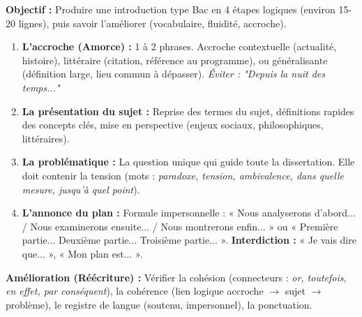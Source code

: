 \documentclass[11pt]{article}
\newcommand{\cle}[1]{{\popxbold\color{popdark}#1}}
\begin{document}
\begin{methode}
    \textbf{Objectif :} Produire une introduction type Bac en 4 étapes logiques (environ 15-20 lignes), puis savoir l'améliorer (vocabulaire, fluidité, accroche).
    \begin{enumerate}
        \item \textbf{L'accroche (Amorce) :} 1 à 2 phrases. \cle{Accroche contextuelle} (actualité, histoire), \cle{littéraire} (citation, référence au programme), ou \cle{généralisante} (définition large, lieu commun à dépasser). \textit{Éviter : "Depuis la nuit des temps..."}
        \item \textbf{La présentation du sujet :} Reprise des termes du sujet, définitions rapides des concepts clés, mise en perspective (enjeux sociaux, philosophiques, littéraires).
        \item \textbf{La problématique :} \cle{La question unique} qui guide toute la dissertation. Elle doit contenir la tension (mots : \emph{paradoxe, tension, ambivalence, dans quelle mesure, jusqu'à quel point}).
        \item \textbf{L'annonce du plan :} \cle{Formule impersonnelle} : « Nous analyserons d'abord... / Nous examinerons ensuite... / Nous montrerons enfin... » ou « Première partie... Deuxième partie... Troisième partie... ». \textbf{Interdiction :} « Je vais dire que... », « Mon plan est... ».
    \end{enumerate}
    \textbf{Amélioration (Réécriture) :} Vérifier la \cle{cohésion} (connecteurs : \emph{or, toutefois, en effet, par conséquent}), la \cle{cohérence} (lien logique accroche $\rightarrow$ sujet $\rightarrow$ problème), le \cle{registre de langue} (soutenu, impersonnel), la \cle{ponctuation}.
\end{methode}
\end{document}
